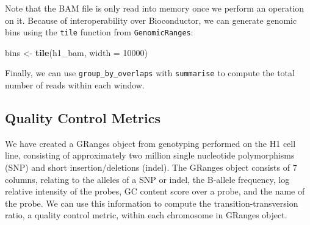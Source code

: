 \documentclass[10pt,letterpaper]{article}
\newenvironment{Shaded}{\begin{snugshade}}{\end{snugshade}}
\newcommand{\DataTypeTok}[1]{\textcolor[rgb]{0.13,0.29,0.53}{#1}}
\newcommand{\DecValTok}[1]{\textcolor[rgb]{0.00,0.00,0.81}{#1}}
\newcommand{\KeywordTok}[1]{\textcolor[rgb]{0.13,0.29,0.53}{\textbf{#1}}}
\newcommand{\NormalTok}[1]{#1}
\newcommand{\OperatorTok}[1]{\textcolor[rgb]{0.81,0.36,0.00}{\textbf{#1}}}
\newcommand{\StringTok}[1]{\textcolor[rgb]{0.31,0.60,0.02}{#1}}
\begin{document}
\begin{Shaded}
\end{Shaded}

Note that the BAM file is only read into memory once we perform an
operation on it. Because of interoperability over Bioconductor, we can
generate genomic bins using the \texttt{tile} function from
\texttt{GenomicRanges}:

\begin{Shaded}
\begin{Highlighting}[]
\NormalTok{bins <-}\StringTok{ }\KeywordTok{tile}\NormalTok{(h1_bam, }\DataTypeTok{width =} \DecValTok{10000}\NormalTok{)}
\end{Highlighting}
\end{Shaded}

Finally, we can use \texttt{group\_by\_overlaps} with \texttt{summarise}
to compute the total number of reads within each window.

\begin{Shaded}
\end{Shaded}

\hypertarget{quality-control-metrics}{%
\subsection{Quality Control Metrics}\label{quality-control-metrics}}

We have created a GRanges object from genotyping performed on the H1
cell line, consisting of approximately two million single nucleotide
polymorphisms (SNP) and short insertion/deletions (indel). The GRanges
object consists of 7 columns, relating to the alleles of a SNP or indel,
the B-allele frequency, log relative intensity of the probes, GC content
score over a probe, and the name of the probe. We can use this
information to compute the transition-transversion ratio, a quality
control metric, within each chromosome in GRanges object.
\end{document}
